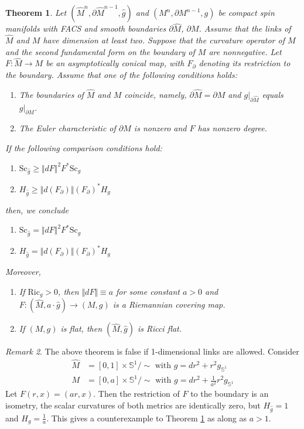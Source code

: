 \documentclass[12pt, reqno]{amsart}
\theoremstyle{plain} %
\newtheorem{theorem}{Theorem}[section]
\theoremstyle{definition}
\theoremstyle{remark}
\newtheorem{remark}[theorem]{Remark}
\numberwithin{equation}{section}
\newcommand{\dom}[1]{\hat{#1}}
\newcommand{\onorm}[1]{\Vert #1 \Vert}
\newcommand{\bnd}[1]{\partial #1}
\newcommand{\sphe}{\mathbb{S}}
\newcommand{\Sc}{\mathrm{Sc}}
\newcommand{\Ric}{\mathrm{Ric}}
\newcommand{\tdim}{n} %
\begin{document}
\begin{theorem}\label{thm:scalar-curvature comparison - manifolds with facs}
    Let \((\dom{M}^{\tdim},\bnd{\dom{M}}^{\tdim-1},\dom{g})\) and \((M^{\tdim},\bnd{M}^{\tdim-1},g)\) be compact spin manifolds with FACS and smooth boundaries \(\bnd{\dom{M}}\), \(\bnd{M}\).
    Assume that the links of \(\dom{M}\) and \(M\) have dimension at least two.
    Suppose that the curvature operator of \(M\) and the second fundamental form on the boundary of \(M\) are nonnegative.
    Let \(F \colon \dom{M} \to M\) be an asymptotically conical map, with \(F_\partial\) denoting its restriction to the boundary.
    Assume that one of the following conditions holds:
	\begin{enumerate}[label=\((\roman*)\)]
		\item The boundaries of \(\dom{M}\) and \(M\) coincide, namely, \(\bnd{\dom{M}} = \bnd{M}\) and \(g|_{\bnd{\dom{M}}}\) equals \(g|_{\bnd{M}}\).
		\item The Euler characteristic of \(\bnd{M}\) is nonzero and \(F\) has nonzero degree.
	\end{enumerate}
	If the following comparison conditions hold:
	\begin{enumerate}[label=\textnormal{(\arabic*)}]
		\item \(\Sc_{\dom{g}} \geq \onorm{dF}^2 F^*\Sc_g\)
		\item \(H_{\dom{g}} \geq \onorm{d(F_\partial)} (F_\partial)^*H_g\)
	\end{enumerate}
	then, we conclude
	\begin{enumerate}[label=\textup{(\Roman*)}]
		\item \(\Sc_{\dom{g}} = \onorm{dF}^2 F^* \Sc_g\)
		\item \(H_{\dom{g}} = \onorm{d(F_\partial)} (F_\partial)^*H_g\)
	\end{enumerate}
	Moreover,
	\begin{enumerate}[label=\((\mathrm{\Roman*}^\prime)\)]
		\item If \(\Ric_g > 0\), then \(\onorm{dF} \equiv a\) for some constant \(a > 0\) and \(F \colon (\dom{M}, a \cdot \dom{g}) \to (M,g)\) is a Riemannian covering map.
		\item If \((M, g)\) is flat, then \((\dom{M}, \dom{g})\) is Ricci flat.
	\end{enumerate}
\end{theorem}
\begin{remark}\label{rem:counterexample to comparison theorem when 1-dimensional links are present}
    The above theorem is false if 1-dimensional links are allowed.
    Consider
    \begin{align*}
        \dom{M} &= [0,1] \times \sphe^1 / \sim \text{ with } \dom{g} = dr^2 + r^2 g_{\sphe^1} \\
        M &= [0,a] \times \sphe^1 / \sim \text{ with } g=dr^2 + \frac{1}{a^2}r^2 g_{\sphe^1}
    \end{align*}
    Let \(F(r,x) = (ar,x)\).
    Then the restriction of \(F\) to the boundary is an isometry, the scalar curvatures of both metrics are identically zero, but \(H_{\dom{g}} = 1\) and \(H_g = \frac{1}{a}\).
    This gives a counterexample to Theorem \ref{thm:scalar-curvature comparison - manifolds with facs} as along as \(a > 1\).
\end{remark}
\end{document}
